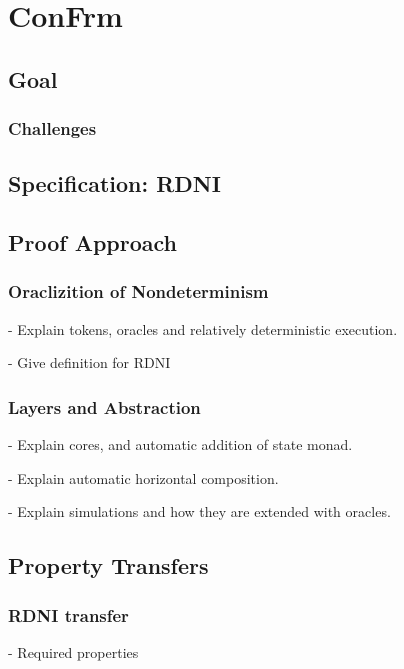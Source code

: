 \chapter{ConFrm}

\section{Goal}



\subsection{Challenges}

\section{Specification: RDNI}

\section{Proof Approach}

\subsection{Oraclizition of Nondeterminism}
- Explain tokens, oracles and relatively deterministic execution.

- Give definition for RDNI

\subsection{Layers and Abstraction}

- Explain cores, and automatic addition of state monad.

- Explain automatic horizontal composition.

- Explain simulations and how they are extended with oracles.

\section{Property Transfers}


\subsection{RDNI transfer}
- Required properties

